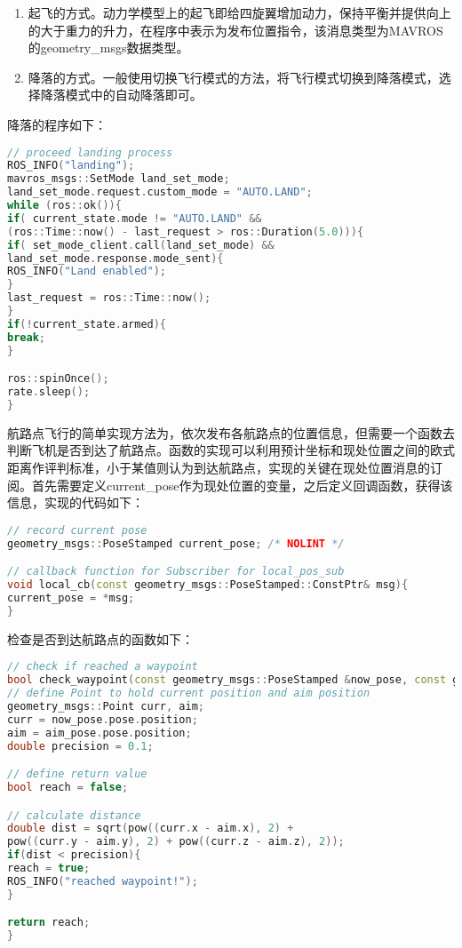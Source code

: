 \begin{enumerate}
	\item 起飞的方式。动力学模型上的起飞即给四旋翼增加动力，保持平衡并提供向上的大于重力的升力，在程序中表示为发布位置指令，该消息类型为MAVROS的geometry\_msgs数据类型。
	\item 降落的方式。一般使用切换飞行模式的方法，将飞行模式切换到降落模式，选择降落模式中的自动降落即可。
\end{enumerate}

降落的程序如下：

\begin{lstlisting}[language={C++}]
// proceed landing process
ROS_INFO("landing");
mavros_msgs::SetMode land_set_mode;
land_set_mode.request.custom_mode = "AUTO.LAND";
while (ros::ok()){
if( current_state.mode != "AUTO.LAND" &&
(ros::Time::now() - last_request > ros::Duration(5.0))){
if( set_mode_client.call(land_set_mode) &&
land_set_mode.response.mode_sent){
ROS_INFO("Land enabled");
}
last_request = ros::Time::now();
}
if(!current_state.armed){
break;
}

ros::spinOnce();
rate.sleep();
}
\end{lstlisting}

航路点飞行的简单实现方法为，依次发布各航路点的位置信息，但需要一个函数去判断飞机是否到达了航路点。函数的实现可以利用预计坐标和现处位置之间的欧式距离作评判标准，小于某值则认为到达航路点，实现的关键在现处位置消息的订阅。首先需要定义current\_pose作为现处位置的变量，之后定义回调函数，获得该信息，实现的代码如下：

\begin{lstlisting}[language={C++}]
// record current pose
geometry_msgs::PoseStamped current_pose; /* NOLINT */

// callback function for Subscriber for local_pos_sub
void local_cb(const geometry_msgs::PoseStamped::ConstPtr& msg){
current_pose = *msg;
}
\end{lstlisting}

检查是否到达航路点的函数如下：

\begin{lstlisting}[language={C++}]
// check if reached a waypoint
bool check_waypoint(const geometry_msgs::PoseStamped &now_pose, const geometry_msgs::PoseStamped &aim_pose){
// define Point to hold current position and aim position
geometry_msgs::Point curr, aim;
curr = now_pose.pose.position;
aim = aim_pose.pose.position;
double precision = 0.1;

// define return value
bool reach = false;

// calculate distance
double dist = sqrt(pow((curr.x - aim.x), 2) +
pow((curr.y - aim.y), 2) + pow((curr.z - aim.z), 2));
if(dist < precision){
reach = true;
ROS_INFO("reached waypoint!");
}

return reach;
}
\end{lstlisting}

